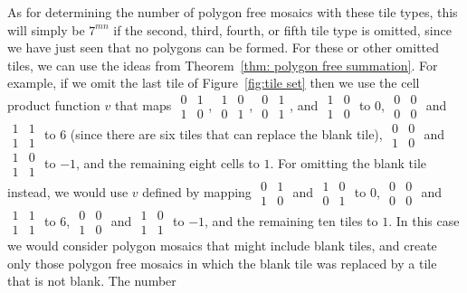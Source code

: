 \documentclass[12pt]{article}
\theoremstyle{plain}
\theoremstyle{remark}
\theoremstyle{definition}
\theoremstyle{remark}
\theoremstyle{definition}
\begin{document}
As for determining the number of polygon free mosaics with these tile types, this will simply be $7^{mn}$ if the second, third, fourth, or fifth tile type is omitted, since we have just seen that no polygons can be formed. For these or other omitted tiles, we can use the ideas from Theorem~\ref{thm: polygon free summation}. For example, if we omit the last tile of Figure~\ref{fig:tile set} then we use the cell product function $v$ that maps $\begin{smallmatrix}0&1\\ 1&0\end{smallmatrix}$, $\begin{smallmatrix}1&0\\ 0&1\end{smallmatrix}$, $\begin{smallmatrix}0&1\\ 0&1\end{smallmatrix}$, and $\begin{smallmatrix}1&0\\ 1&0\end{smallmatrix}$ to $0$, $\begin{smallmatrix}0&0\\ 0&0\end{smallmatrix}$ and $\begin{smallmatrix}1&1\\ 1&1\end{smallmatrix}$ to $6$ (since there are six tiles that can replace the blank tile), $\begin{smallmatrix}0&0\\ 1&0\end{smallmatrix}$ and $\begin{smallmatrix}1&0\\ 1&1\end{smallmatrix}$ to $-1$, and the remaining eight cells to $1$. For omitting the blank tile instead, we would use $v$ defined by mapping $\begin{smallmatrix}0&1\\ 1&0\end{smallmatrix}$ and $\begin{smallmatrix}1&0\\ 0&1\end{smallmatrix}$ to 0, $\begin{smallmatrix}0&0\\ 0&0\end{smallmatrix}$ and $\begin{smallmatrix}1&1\\ 1&1\end{smallmatrix}$ to $6$, $\begin{smallmatrix}0&0\\ 1&0\end{smallmatrix}$ and $\begin{smallmatrix}1&0\\ 1&1\end{smallmatrix}$ to $-1$, and the remaining ten tiles to $1$. In this case we would consider polygon mosaics that might include blank tiles, and create only those polygon free mosaics in which the blank tile was replaced by a tile that is not blank. The number 
\end{document}
